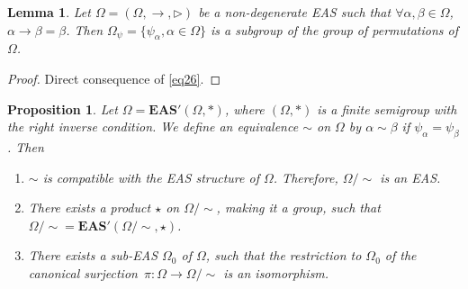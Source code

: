 \documentclass[pdftex]{sigma}
\numberwithin{equation}{section}
\newtheorem{Lemma}[Theorem]{Lemma}
\newtheorem{Proposition}[Theorem]{Proposition}
 { \theoremstyle{definition}
\newtheorem{Definition}[Theorem]{Definition}
\newtheorem{Note}[Theorem]{Note}
\newtheorem{Example}[Theorem]{Example}
\newtheorem{Remark}[Theorem]{Remark}
\newtheorem{Notation}[Theorem]{Notation}}
\newcommand{\eas}{\mathbf{EAS}}
\begin{document}
\begin{Lemma}\label{lem3.6}
Let $\Omega=(\Omega,\rightarrow,\triangleright)$ be a non-degenerate EAS such that $\forall \alpha,\beta \in \Omega$,
$\alpha \rightarrow\beta=\beta$.
Then $\Omega_\psi=\{\psi_\alpha, \alpha\in \Omega\}$ is a subgroup of the group of permutations of $\Omega$.
\end{Lemma}

\begin{proof} Direct consequence of \eqref{eq26}. \end{proof}

\begin{Proposition}\label{prop3.7}
Let $\Omega=\eas'(\Omega,*)$, where $(\Omega,*)$ is a finite semigroup with the right inverse condition. We define an equivalence $\sim$ on $\Omega$ by $\alpha \sim \beta$ if $\psi_\alpha=\psi_\beta$. Then
\begin{enumerate}\itemsep=0pt
\item[$(1)$] $\sim$ is compatible with the EAS structure of $\Omega$. Therefore, $\Omega/{\sim}$ is an EAS.
\item[$(2)$] There exists a product $\star$ on $\Omega/{\sim}$, making it a group, such that $\Omega/{\sim}=\eas'(\Omega/{\sim},\star)$.
\item[$(3)$] There exists a sub-EAS $\Omega_0$ of $\Omega$, such that the restriction to $\Omega_0$ of the canonical surjection~${\pi\colon\Omega\longrightarrow \Omega/{\sim}}$ is an isomorphism.
\end{enumerate}\end{Proposition}
\end{document}

